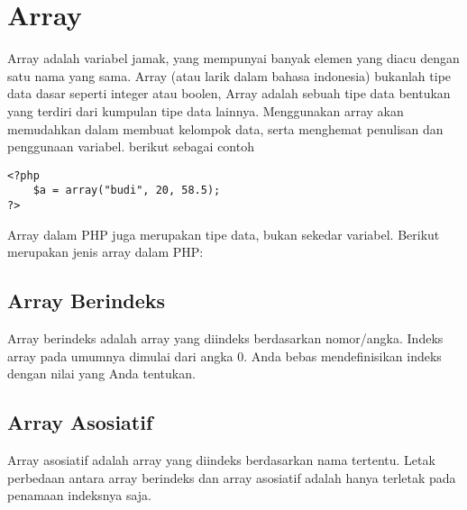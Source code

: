 \section{Array}
Array adalah variabel jamak, yang mempunyai banyak elemen yang diacu dengan satu nama yang sama. Array (atau larik dalam bahasa indonesia) bukanlah tipe data dasar seperti integer atau boolen, Array adalah sebuah tipe data bentukan yang terdiri dari kumpulan tipe data lainnya. Menggunakan array akan memudahkan dalam membuat kelompok data, serta menghemat penulisan dan penggunaan variabel. berikut sebagai contoh
 \begin{lstlisting}
<?php
    $a = array("budi", 20, 58.5);
?>
\end{lstlisting}
Array dalam PHP juga merupakan tipe data, bukan sekedar variabel. Berikut merupakan jenis array dalam PHP:
\subsection{Array Berindeks}
Array berindeks adalah array yang diindeks berdasarkan nomor/angka. Indeks array pada umumnya dimulai dari angka 0. Anda bebas mendefinisikan indeks dengan nilai yang Anda tentukan.
\subsection{Array Asosiatif}
Array asosiatif adalah array yang diindeks berdasarkan nama tertentu. Letak perbedaan antara array berindeks dan array asosiatif adalah hanya terletak pada penamaan indeksnya saja.